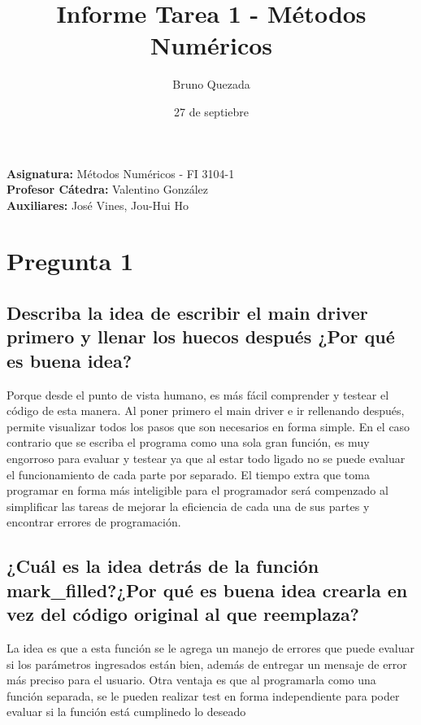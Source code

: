 \documentclass[10pt,a4paper]{article}
\title{Informe Tarea 1 - M\'etodos Num\'ericos}
\author{Bruno Quezada}
\date{27 de septiebre}
\begin{document}
\maketitle

\vspace{17cm}
\begin{flushright}
\textbf{Asignatura:} Métodos Numéricos - FI 3104-1\\
\textbf{Profesor Cátedra:} Valentino González\\
\textbf{Auxiliares:} José Vines, Jou-Hui Ho \\
\end{flushright}
\pagebreak


\section{Pregunta 1}

\subsection{Describa la idea de escribir el main driver primero y llenar los huecos después ¿Por qué es buena idea?}
Porque desde el punto de vista humano, es más fácil comprender y testear el código de esta manera. Al poner primero el main driver e ir  rellenando después, permite visualizar todos los pasos que son necesarios en forma simple. En el caso contrario que se escriba el programa como una sola gran función, es muy engorroso para evaluar y testear ya que al estar todo ligado no se puede evaluar el funcionamiento de cada parte por separado. El tiempo extra que toma programar en forma más inteligible para el programador será compenzado al simplificar las tareas de mejorar la eficiencia de cada una de sus partes y encontrar errores de programación.


\subsection{¿Cuál es la idea detrás de la función mark\_filled?¿Por qué es buena idea crearla en vez del código original al que reemplaza?}
La idea es que a esta función se le agrega un manejo de errores que puede evaluar si los parámetros ingresados están bien, además de entregar un mensaje de error más preciso para el usuario. Otra ventaja es que al programarla como una función separada, se le pueden realizar test en forma independiente para poder evaluar si la función está cumplinedo lo deseado
\end{document}
